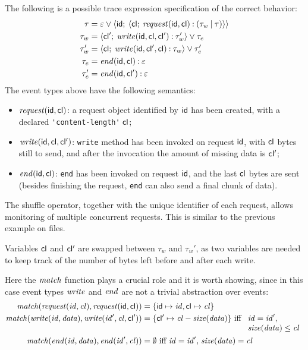 The following is a possible trace expression specification of the correct behavior:
\begin{align*}
\tau &= \varepsilon \mathbin{\vee} {\langle}\mathsf{id};\:{{\langle}\mathsf{cl};\:{ \mathit{request}(\mathsf{id}, \mathsf{cl}) \mathbin{:} (\tau_w\mathbin{|}\tau)}{\rangle}}{\rangle}\\
\tau_w &= {\langle}\mathsf{cl'};\:{\mathit{write}(\mathsf{id}, \mathsf{cl}, \mathsf{cl'})\mathbin{:}\tau_w'}{\rangle} \mathbin{\vee} \tau_e\\
\tau_w' &= {\langle}\mathsf{cl};\:{\mathit{write}(\mathsf{id}, \mathsf{cl'}, \mathsf{cl})\mathbin{:} \tau_w}{\rangle} \mathbin{\vee} \tau_e'\\
\tau_e &= \mathit{end}(\mathsf{id}, \mathsf{cl})\mathbin{:} \varepsilon\\
\tau_e' &= \mathit{end}(\mathsf{id}, \mathsf{cl'})\mathbin{:}\varepsilon
\end{align*}
The event types above have the following semantics:
\begin{itemize}
\item  \(\mathit{request}(\mathsf{id}, \mathsf{cl})\): a request object identified by \(\mathsf{id}\) has been created, with a declared \lstinline{'content-length'} \(\mathsf{cl}\);
\item \(\mathit{write}(\mathsf{id}, \mathsf{cl}, \mathsf{cl'})\): \lstinline{write} method has been invoked on request \(\mathsf{id}\), with \(\mathsf{cl}\) bytes still to send, and after the invocation the amount of missing data is \(\mathsf{cl'}\);
\item \(\mathit{end}(\mathsf{id}, \mathsf{cl})\): \lstinline{end} has been invoked on request \(\mathsf{id}\), and the last \(\mathsf{cl}\) bytes are sent (besides finishing the request, \lstinline{end} can also send a final chunk of data).
\end{itemize}

The shuffle operator, together with the unique identifier of each request, allows monitoring of multiple concurrent requests.
This is similar to the previous example on files.

Variables \(\mathsf{cl}\) and \(\mathsf{cl'}\) are swapped between \(\tau_w\) and \(\tau_w'\), as two variables are needed to keep track of the number of bytes left before and after each write.

Here the \(\mathit{match}\) function plays a crucial role and it is worth showing, since in this case event types $\mathit{write}$ and $\mathit{end}$ are not a trivial abstraction over events:
\begin{align*}
\mathit{match}(\mathit{request}(\mathit{id}, \mathit{cl}), \mathit{request}(\mathsf{id}, \mathsf{cl})) &= \{ \mathsf{id} \mapsto \mathit{id}, \mathsf{cl} \mapsto \mathit{cl} \}\\
\mathit{match}(\mathit{write}(\mathit{id}, \mathit{data}), \mathit{write}(\mathit{id}', \mathit{cl}, \mathsf{cl'})) &= \{ \mathsf{cl'} \mapsto \mathit{cl}-\mathit{size}(\mathit{data}) \} \mbox{ iff $\begin{array}[t]{l}\mathit{id}=\mathit{id}',\\ \mathit{size}(\mathit{data})\leq\mathit{cl}\end{array}$} \\
\mathit{match}(\mathit{end}(\mathit{id}, \mathit{data}), \mathit{end}(\mathit{id}', \mathit{cl})) &= \emptyset \mbox{ iff $\mathit{id}=\mathit{id}',\, \mathit{size}(\mathit{data})=\mathit{cl}$}
\end{align*}

